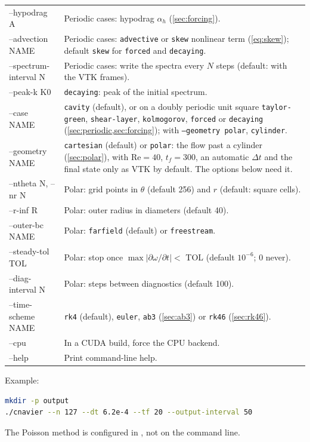 \documentclass[11pt,a4paper]{article}
\newcommand{\Rey}{\mathrm{Re}}
\newcommand{\dt}{\Delta t}
\newcommand{\code}[1]{\texttt{\detokenize{#1}}}
\begin{document}
\begin{longtable}{@{}>{\ttfamily}p{}p{}@{}}
--hypodrag A & Periodic cases: hypodrag $\alpha_h$ (\cref{sec:forcing}). \\
--advection NAME & Periodic cases: \texttt{advective} or \texttt{skew} nonlinear term (\cref{eq:skew}); default \texttt{skew} for \texttt{forced} and \texttt{decaying}. \\
--spectrum-interval N & Periodic cases: write the spectra every $N$ steps (default: with the VTK frames). \\
--peak-k K0 & \texttt{decaying}: peak of the initial spectrum. \\
--case NAME & \texttt{cavity} (default), or on a doubly periodic unit square \texttt{taylor-green}, \texttt{shear-layer}, \texttt{kolmogorov}, \texttt{forced} or \texttt{decaying} (\cref{sec:periodic,sec:forcing}); with \texttt{--geometry polar}, \texttt{cylinder}. \\
--geometry NAME & \texttt{cartesian} (default) or \texttt{polar}: the flow past a cylinder (\cref{sec:polar}), with $\Rey=40$, $t_f=300$, an automatic $\dt$ and the final state only as VTK by default.  The options below need it. \\
--ntheta N, --nr N & Polar: grid points in $\theta$ (default 256) and $r$ (default: square cells). \\
--r-inf R & Polar: outer radius in diameters (default 40). \\
--outer-bc NAME & Polar: \texttt{farfield} (default) or \texttt{freestream}. \\
--steady-tol TOL & Polar: stop once $\max|\partial\omega/\partial t|<$ TOL (default $10^{-6}$; 0 never). \\
--diag-interval N & Polar: steps between diagnostics (default 100). \\
--time-scheme NAME & \texttt{rk4} (default), \texttt{euler}, \texttt{ab3} (\cref{sec:ab3}) or \texttt{rk46} (\cref{sec:rk46}). \\
--cpu & In a CUDA build, force the CPU backend. \\
--help & Print command-line help. \\
\bottomrule
\end{longtable}

Example:
\begin{lstlisting}[language=bash]
mkdir -p output
./cnavier --n 127 --dt 6.2e-4 --tf 20 --output-interval 50
\end{lstlisting}

The Poisson method is configured in \code{src/main.c}, not on the command line.
\end{document}
